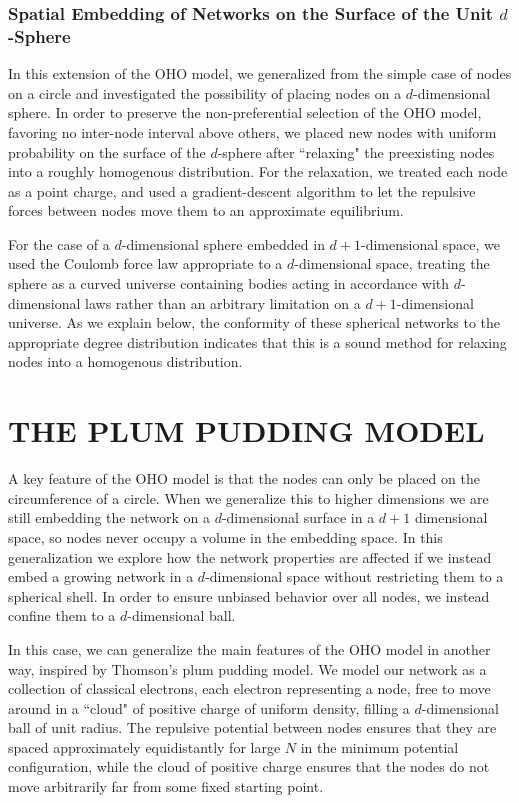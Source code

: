 \documentclass[aps,pre,reprint,superscriptaddress,amsmath,amssymb,nofootinbib]{revtex4-1}
\begin{document}
\subsubsection{Spatial Embedding of Networks on the Surface of the Unit $d$-Sphere}
In this extension of the OHO model, we generalized from the simple case of nodes on a circle and investigated the possibility of placing nodes on a $d$-dimensional sphere.
In order to preserve the non-preferential selection of the OHO model, favoring no inter-node interval above others, we placed new nodes with uniform probability on the surface of the $d$-sphere after ``relaxing" the preexisting nodes into a roughly homogenous distribution. 
For the relaxation, we treated each node as a point charge, and used a gradient-descent algorithm to let the repulsive forces between nodes move them to an approximate equilibrium.

For the case of a $d$-dimensional sphere embedded in $d+1$-dimensional space, we used the Coulomb force law appropriate to a $d$-dimensional space, treating the sphere as a curved universe containing bodies acting in accordance with $d$-dimensional laws rather than an arbitrary limitation on a $d+1$-dimensional universe.  
As we explain below, the conformity of these spherical networks to the appropriate degree distribution indicates that this is a sound method for relaxing nodes into a homogenous distribution.

\section{THE PLUM PUDDING MODEL}
A key feature of the OHO model is that the nodes can only be placed on the circumference of a circle. 
When we generalize this to higher dimensions we are still embedding the network on a $d$-dimensional surface in a $d+1$ dimensional space, so nodes never occupy a volume in the embedding space.
In this generalization we explore how the network properties are affected if we instead embed a growing network in a $d$-dimensional space without restricting them to a spherical shell.  
In order to ensure unbiased behavior over all nodes, we instead confine them to a $d$-dimensional ball. 

In this case, we can generalize the main features of the OHO model in another way, inspired by Thomson's plum pudding model.
We model our network as a collection of classical electrons, each electron representing a node, free to move around in a ``cloud" of positive charge of uniform density, filling a $d$-dimensional ball of unit radius.
The repulsive potential between nodes ensures that they are spaced approximately equidistantly for large $N$ in the minimum potential configuration, while the cloud of positive charge ensures that the nodes do not move arbitrarily far from some fixed starting point.
\end{document}

